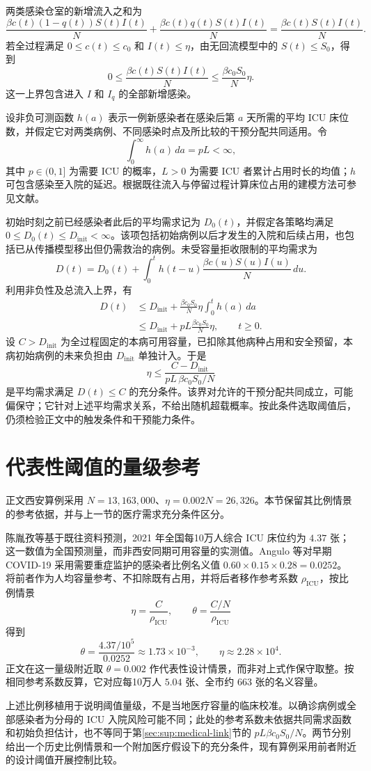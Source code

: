 \documentclass[lang=cn,a4paper,newtx]{elegantpaper}
\begin{document}
两类感染仓室的新增流入之和为
\[
\frac{\beta c(t)(1-q(t))S(t)I(t)}{N}
+\frac{\beta c(t)q(t)S(t)I(t)}{N}
=\frac{\beta c(t)S(t)I(t)}{N}.
\]
若全过程满足 $0\le c(t)\le c_0$ 和 $I(t)\le\eta$，由无回流模型中的 $S(t)\le S_0$，得到
\[
0\le\frac{\beta c(t)S(t)I(t)}{N}
\le\frac{\beta c_0S_0}{N}\eta.
\]
这一上界包含进入 $I$ 和 $I_q$ 的全部新增感染。

设非负可测函数 $h(a)$ 表示一例新感染者在感染后第 $a$ 天所需的平均 ICU 床位数，并假定它对两类病例、不同感染时点及所比较的干预分配共同适用。令
\[
\int_0^\infty h(a)\,da=pL<\infty,
\]
其中 $p\in(0,1]$ 为需要 ICU 的概率，$L>0$ 为需要 ICU 者累计占用时长的均值；$h$ 可包含感染至入院的延迟。根据既往流入与停留过程计算床位占用的建模方法可参见文献\cite{Baas2021Occupancy}。

初始时刻之前已经感染者此后的平均需求记为 $D_0(t)$，并假定各策略均满足 $0\le D_0(t)\le D_{\mathrm{init}}<\infty$。该项包括初始病例以后才发生的入院和后续占用，也包括已从传播模型移出但仍需救治的病例。未受容量拒收限制的平均需求为
\[
D(t)=D_0(t)+\int_0^t h(t-u)
\frac{\beta c(u)S(u)I(u)}{N}\,du.
\]
利用非负性及总流入上界，有
\[
\begin{aligned}
D(t)
&\le D_{\mathrm{init}}+
\frac{\beta c_0S_0}{N}\eta\int_0^t h(a)\,da\\
&\le D_{\mathrm{init}}+pL\frac{\beta c_0S_0}{N}\eta,
\qquad t\ge0.
\end{aligned}
\]
设 $C>D_{\mathrm{init}}$ 为全过程固定的本病可用容量，已扣除其他病种占用和安全预留，本病初始病例的未来负担由 $D_{\mathrm{init}}$ 单独计入。于是
\[
\eta\le\frac{C-D_{\mathrm{init}}}{pL\,\beta c_0S_0/N}
\]
是平均需求满足 $D(t)\le C$ 的充分条件。该界对允许的干预分配共同成立，可能偏保守；它针对上述平均需求关系，不给出随机超载概率。按此条件选取阈值后，仍须检验正文中的触发条件和干预能力条件。

\section{代表性阈值的量级参考}
\label{sec:sup:threshold-scale}
正文西安算例采用 $N=13{,}163{,}000$\cite{XianStat2021}、$\eta=0.002N=26{,}326$。本节保留其比例情景的参考依据，并与上一节的医疗需求充分条件区分。

陈胤孜等\cite{Chen2021ICUForecast}基于既往资料预测，2021 年全国每10万人综合 ICU 床位约为 $4.37$ 张；这一数值为全国预测量，而非西安同期可用容量的实测值。Angulo 等\cite[补充材料 S4.1]{Angulo2021}对早期 COVID-19 采用需要重症监护的感染者比例名义值 $0.60\times0.15\times0.28=0.0252$。将前者作为人均容量参考、不扣除既有占用，并将后者移作参考系数 $\rho_{\mathrm{ICU}}$，按比例情景
\[
\eta=\frac{C}{\rho_{\mathrm{ICU}}},\qquad
\theta=\frac{C/N}{\rho_{\mathrm{ICU}}}
\]
得到
\[
\theta=\frac{4.37/10^5}{0.0252}\approx1.73\times10^{-3},
\qquad \eta\approx2.28\times10^4.
\]
正文在这一量级附近取 $\theta=0.002$ 作代表性设计情景，而非对上式作保守取整。按相同参考系数反算，它对应每10万人 $5.04$ 张、全市约 $663$ 张的名义容量。

上述比例移植用于说明阈值量级，不是当地医疗容量的临床校准。以确诊病例或全部感染者为分母的 ICU 入院风险可能不同\cite{Pung2023Undetected}；此处的参考系数未依据共同需求函数和初始负担估计，也不等同于第\ref{sec:sup:medical-link}节的 $pL\beta c_0S_0/N$。两节分别给出一个历史比例情景和一个附加医疗假设下的充分条件，现有算例采用前者附近的设计阈值开展控制比较。

\printbibliography[title={参考文献}]
\end{document}

